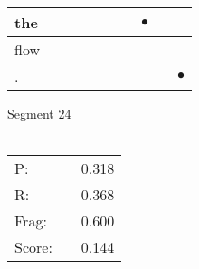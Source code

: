 \documentclass[landscape]{article}
\newcommand{\ssp}{\hspace{2pt}}
\newcommand{\mex}{\cellcolor{g}$\bullet$}
\begin{document}
\begin{tabular}{|l|p{10pt}|p{10pt}|p{10pt}|p{10pt}|p{10pt}|p{10pt}|p{10pt}|p{10pt}|p{10pt}|}
\hline
\ssp \cellcolor{ref6}the \ssp&\hspace{2pt}&\hspace{2pt}&\hspace{2pt}&\hspace{2pt}&\hspace{2pt}&\hspace{2pt}&\hspace{2pt}\mex&\hspace{2pt}&\hspace{2pt}\\
\hline
\ssp flow \ssp&\hspace{2pt}&\hspace{2pt}&\hspace{2pt}&\hspace{2pt}&\hspace{2pt}&\hspace{2pt}&\hspace{2pt}&\hspace{2pt}&\hspace{2pt}\\
\hline
\ssp \cellcolor{ref8}. \ssp&\hspace{2pt}&\hspace{2pt}&\hspace{2pt}&\hspace{2pt}&\hspace{2pt}&\hspace{2pt}&\hspace{2pt}&\hspace{2pt}&\hspace{2pt}\mex\\
\hline
\end{tabular}

\vspace{6pt}
\noindent Segment 24\\\\
\noindent\begin{tabular}{lm{12pt}r}
\hline
P:&&0.318\\
R:&&0.368\\
Frag:&&0.600\\
Score:&&0.144\\
\end{tabular}

\newpage
\end{document}
